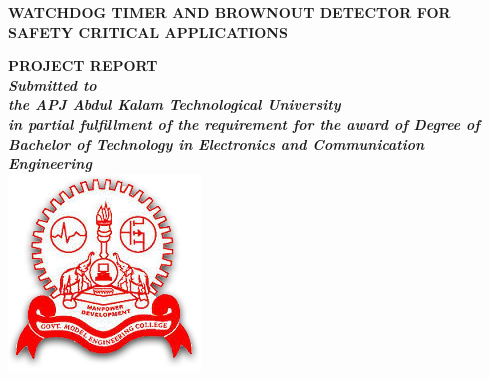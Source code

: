 \documentclass[10pt]{report}
\begin{document}
\begin{titlepage}
\pagestyle{empty}
\newcommand{\HRule}{\rule{\linewidth}{0.5mm}} %

\center %
 
\linespread{1.0}
    {\Huge \bfseries WATCHDOG TIMER AND BROWNOUT DETECTOR FOR SAFETY CRITICAL APPLICATIONS


 \par}

\vspace{1.1cm}
\LARGE \bfseries PROJECT REPORT\\[1.25cm] %
\large \emph{Submitted to \\the APJ Abdul Kalam Technological University\\ 
 in partial fulfillment of the requirement for the award of
Degree of\\ Bachelor of Technology in Electronics and Communication Engineering}
\\[2cm] %


\includegraphics[scale=.75]{mec.png}\\ %
 


\end{titlepage}
\end{document}
